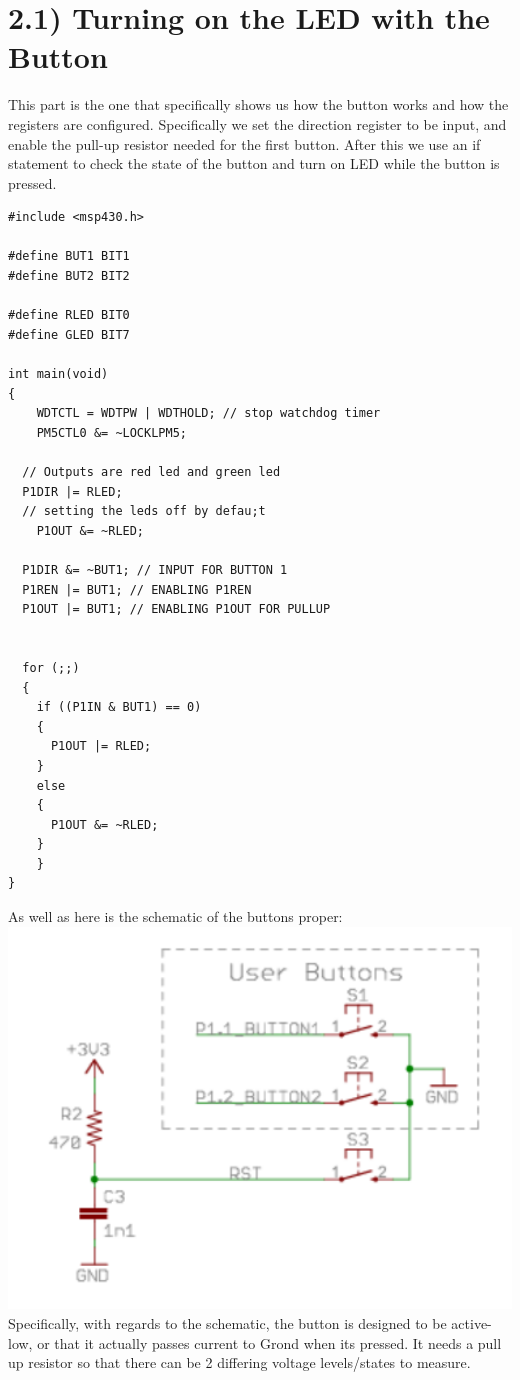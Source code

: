 \documentclass{article}
\begin{document}
\section{2.1) Turning on the LED with the Button}
This part is the one that specifically shows us how the button works and how the registers are configured. Specifically we set the direction register to be input, and enable the pull-up resistor needed for the first button. After this we use an if statement to check the state of the button and turn on LED while the button is pressed.
\begin{lstlisting}
#include <msp430.h>

#define BUT1 BIT1
#define BUT2 BIT2

#define RLED BIT0
#define GLED BIT7

int main(void)
{
	WDTCTL = WDTPW | WDTHOLD; // stop watchdog timer
	PM5CTL0 &= ~LOCKLPM5;

  // Outputs are red led and green led
  P1DIR |= RLED;
  // setting the leds off by defau;t
	P1OUT &= ~RLED;

  P1DIR &= ~BUT1; // INPUT FOR BUTTON 1
  P1REN |= BUT1; // ENABLING P1REN
  P1OUT |= BUT1; // ENABLING P1OUT FOR PULLUP


  for (;;)
  {
    if ((P1IN & BUT1) == 0)
    {
      P1OUT |= RLED;
    }
    else
    {
      P1OUT &= ~RLED;
    }  
	}
}
\end{lstlisting}
As well as here is the schematic of the buttons proper:
\newline
\includegraphics[width=1\textwidth]{pictures/2_1.png}
Specifically, with regards to the schematic, the button is designed to be active-low, or that it actually passes current to Grond when its pressed. It needs a pull up resistor so that there can be 2 differing voltage levels/states to measure.
\end{document}

